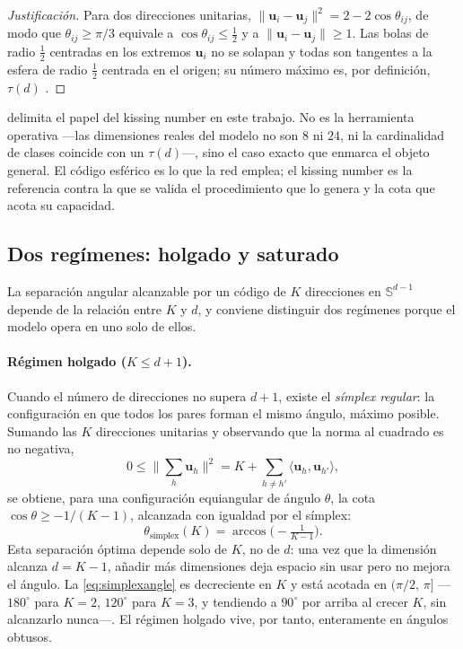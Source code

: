 \documentclass[11pt,a4paper]{article}
\theoremstyle{plain}
\newcommand{\Sph}{\mathbb{S}}
\begin{document}
\begin{proof}[Justificación]
Para dos direcciones unitarias,
$\lVert\bm{u}_i-\bm{u}_j\rVert^2 = 2-2\cos\theta_{ij}$, de modo que
$\theta_{ij}\ge\pi/3$ equivale a
$\cos\theta_{ij}\le\tfrac12$ y a
$\lVert\bm{u}_i-\bm{u}_j\rVert\ge 1$. Las bolas de radio $\tfrac12$
centradas en los extremos $\bm{u}_i$ no se solapan y todas son tangentes
a la esfera de radio $\tfrac12$ centrada en el origen; su número máximo
es, por definición, $\tau(d)$ \cite{conway1999}.
\end{proof}

 delimita el papel del kissing number en este
trabajo. No es la herramienta operativa ---las dimensiones reales del
modelo no son $8$ ni $24$, ni la cardinalidad de clases coincide con un
$\tau(d)$---, sino el caso exacto que enmarca el objeto general. El
código esférico es lo que la red emplea; el kissing number es la
referencia contra la que se valida el procedimiento que lo genera y la
cota que acota su capacidad.

\subsection{Dos regímenes: holgado y saturado}
\label{sec:theory:regimes}

La separación angular alcanzable por un código de $K$ direcciones en
$\Sph^{d-1}$ depende de la relación entre $K$ y $d$, y conviene
distinguir dos regímenes porque el modelo opera en uno solo de ellos.

\paragraph{Régimen holgado ($K\le d+1$).} Cuando el número de
direcciones no supera $d+1$, existe el \emph{símplex regular}: la
configuración en que todos los pares forman el mismo ángulo, máximo
posible. Sumando las $K$ direcciones unitarias y observando que la
norma al cuadrado es no negativa,
\begin{equation}
0 \le \Big\lVert \textstyle\sum_h \bm{u}_h \Big\rVert^2
  = K + \sum_{h\neq h'}\langle\bm{u}_h,\bm{u}_{h'}\rangle,
\label{eq:simplex}
\end{equation}
se obtiene, para una configuración equiangular de ángulo $\theta$, la
cota $\cos\theta \ge -1/(K-1)$, alcanzada con igualdad por el símplex:
\begin{equation}
\theta_{\mathrm{símplex}}(K)
  = \arccos\!\big(-\tfrac{1}{K-1}\big).
\label{eq:simplexangle}
\end{equation}
Esta separación óptima depende solo de $K$, no de $d$: una vez que la
dimensión alcanza $d=K-1$, añadir más dimensiones deja espacio sin usar
pero no mejora el ángulo. La \cref{eq:simplexangle} es decreciente en
$K$ y está acotada en $(\pi/2,\,\pi]$ ---$180^\circ$ para $K=2$,
$120^\circ$ para $K=3$, y tendiendo a $90^\circ$ por arriba al crecer
$K$, sin alcanzarlo nunca---. El régimen holgado vive, por tanto,
enteramente en ángulos obtusos.
\end{document}
